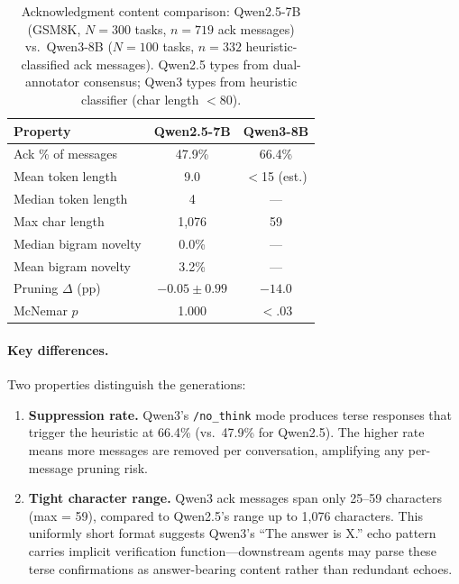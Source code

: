 \begin{table}[ht]
\centering
\caption{Acknowledgment content comparison: Qwen2.5-7B (GSM8K, $N = 300$ tasks, $n = 719$ ack messages) vs.\ Qwen3-8B ($N = 100$ tasks, $n = 332$ heuristic-classified ack messages). Qwen2.5 types from dual-annotator consensus; Qwen3 types from heuristic classifier (char length $< 80$).}
\label{tab:qwen3_vs_qwen25}
\small
\begin{tabular}{lcc}
\toprule
\textbf{Property} & \textbf{Qwen2.5-7B} & \textbf{Qwen3-8B} \\
\midrule
Ack \% of messages & 47.9\% & 66.4\% \\
Mean token length & 9.0 & $<$15 (est.) \\
Median token length & 4 & --- \\
Max char length & 1{,}076 & 59 \\
Median bigram novelty & 0.0\% & --- \\
Mean bigram novelty & 3.2\% & --- \\
Pruning $\Delta$ (pp) & $-0.05 \pm 0.99$ & $-14.0$ \\
McNemar $p$ & 1.000 & $<.03$ \\
\bottomrule
\end{tabular}
\end{table}

\paragraph{Key differences.} Two properties distinguish the generations:
\begin{enumerate}[nosep, leftmargin=*]
    \item \textbf{Suppression rate.} Qwen3's \texttt{/no\_think} mode produces terse responses that trigger the heuristic at 66.4\% (vs.\ 47.9\% for Qwen2.5). The higher rate means more messages are removed per conversation, amplifying any per-message pruning risk.
    \item \textbf{Tight character range.} Qwen3 ack messages span only 25--59 characters (max = 59), compared to Qwen2.5's range up to 1{,}076 characters. This uniformly short format suggests Qwen3's ``The answer is X.'' echo pattern carries implicit verification function---downstream agents may parse these terse confirmations as answer-bearing content rather than redundant echoes.
\end{enumerate}

